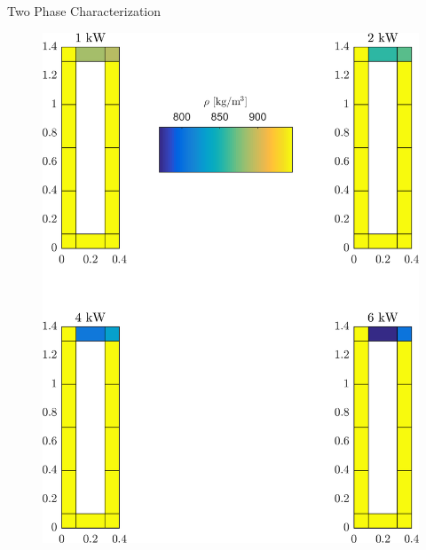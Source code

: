 \documentclass[10pt,t,xcolor=table,compress]{UWMadBeamer}
\begin{document}
\begin{frame}{Two Phase Characterization}
{\begin{figure}
                \includegraphics[scale=0.074]{Distribution_Density-390K-2Phi}%
            \end{figure}
        }
\end{frame}
\end{document}
